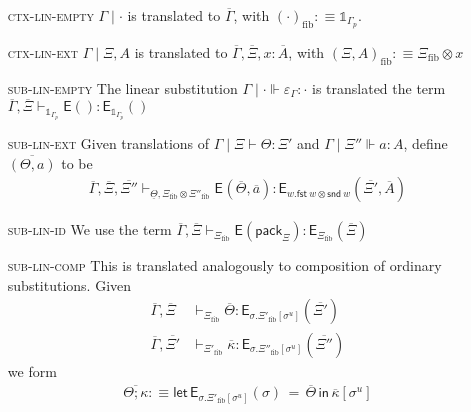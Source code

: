 \documentclass[10pt]{article}
\theoremstyle{definition}
\newcommand\dsd[1]{\ensuremath{\mathsf{#1}}}
\newcommand{\yields}{\vdash}
\newcommand{\app}[2]{\ensuremath{#1 \: #2}}
\newcommand{\fst}[1]{\app{\dsd{fst}}{#1}}
\newcommand{\snd}[1]{\app{\dsd{snd}}{#1}}
\newcommand\E[2]{\ensuremath{\mathsf{E}_{#1}(#2)}}
\newcommand\EEs[4]{\ensuremath{\mathsf{let} \, \mathsf{E}_{#1}(#3) \, = \, {#2} \, \mathsf{in} \, #4}}
\newcommand\EI[1]{\ensuremath{\mathsf{E}{(#1)}}}
\newcommand\EIs[2]{\ensuremath{\mathsf{E}_{#1}{(#2)}}}
\newcommand\pack[1]{\ensuremath{\mathsf{pack}_{#1}}}
\newcommand\unp[2]{\ensuremath{{#2}^u}}
\newcommand{\modeof}[1]{{#1}_p}
\newcommand{\qyields}{\Vdash}
\newcommand{\upstairs}[1]{\overline{#1}}
\newcommand{\downstairs}[1]{\underline{#1}}
\newcommand\One{\ensuremath{\mathds{1}}}
\newcommand{\fibshape}[1]{\ensuremath{{#1}_{\mathrm{fib}}}}
\begin{document}
\begin{enumerate}
\item[\textsc{ctx-lin-empty}] $\Gamma \mid \cdot$ is translated to $\upstairs{\Gamma}$, with $\fibshape{(\cdot)} :\equiv \One_{\modeof{\Gamma}}$.
\item[\textsc{ctx-lin-ext}] $\Gamma \mid \Xi, A$ is translated to $\upstairs{\Gamma}, \upstairs{\Xi}, x : \upstairs{A}$, with $\fibshape{(\Xi, A)} :\equiv \fibshape{\Xi} \otimes x$
\item[\textsc{sub-lin-empty}]  The linear substitution $\Gamma \mid \cdot \qyields \varepsilon_{\Gamma} : \cdot$ is translated the term $\upstairs{\Gamma}, \upstairs{\Xi} \yields_{\One_{\modeof{\Gamma}}} \EI{} : \E{\One_{\modeof{\Gamma}}}{}$
\item[\textsc{sub-lin-ext}] Given translations of $\Gamma \mid \Xi \yields \Theta : \Xi'$ and $\Gamma \mid \Xi'' \qyields a : A$, define $\upstairs{(\Theta, a)}$ to be
\begin{align*}
\upstairs{\Gamma}, \upstairs{\Xi}, \upstairs{\Xi''} \yields_{\downstairs{\Theta}, \fibshape{\Xi} \otimes \fibshape{\Xi''}} \EIs{}{\upstairs{\Theta}, \upstairs{a}} : \E{w. \fst w \otimes \snd w}{\upstairs{\Xi'}, \upstairs{A}}
\end{align*}
\item[\textsc{sub-lin-id}] We use the term $\upstairs{\Gamma}, \upstairs{\Xi} \yields_{\fibshape{\Xi}} \EI{\pack{\Xi}} : \E{\fibshape{\Xi}}{\upstairs{\Xi}}$
\item[\textsc{sub-lin-comp}] This is translated analogously to composition of ordinary substitutions. Given
\begin{align*}
\upstairs{\Gamma}, \upstairs{\Xi} &\yields_{\fibshape{\Xi}} \upstairs{\Theta} : \E{\sigma.\fibshape{\Xi'}[\unp{\Xi'}{\sigma}]}{\upstairs{\Xi'}} \\
\upstairs{\Gamma}, \upstairs{\Xi'} &\yields_{\fibshape{\Xi'}} \upstairs{\kappa} : \E{\sigma.\fibshape{\Xi''}[\unp{\Xi''}{\sigma}]}{\upstairs{\Xi''}}
\end{align*}
we form
\begin{align*}
\upstairs{\Theta;\kappa} :\equiv \EEs{\sigma.\fibshape{\Xi'}[\unp{\Xi'}{\sigma}]}{\upstairs{\Theta}}{\sigma}{\upstairs{\kappa}[\unp{\upstairs{\Delta}}{\sigma}]}
\end{align*}


\end{enumerate}
\end{document}
